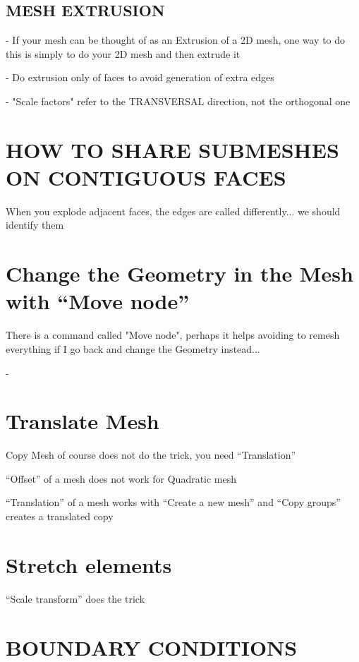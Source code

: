 \documentclass[10pt]{book}
\begin{document}
    
\subsection{MESH EXTRUSION}


- If your mesh can be thought of as an Extrusion of a 2D mesh, one way to do this 
  is simply to do your 2D mesh and then extrude it
  
- Do extrusion only of faces to avoid generation of extra edges    

- "Scale factors" refer to the TRANSVERSAL direction, not the orthogonal one



\section{HOW TO SHARE SUBMESHES ON CONTIGUOUS FACES}


When you explode adjacent faces, the edges are called differently... we should identify them


 \section{Change the Geometry in the Mesh with ``Move node''}


 There is a command called "Move node", perhaps it helps avoiding to remesh everything if I go back and change the Geometry instead...

 - 
 

\section{Translate Mesh}

 
 Copy Mesh of course does not do the trick, you need ``Translation''
 
 ``Offset'' of a mesh does not work for Quadratic mesh
 
 ``Translation'' of a mesh works with ``Create a new mesh'' and ``Copy groups'' creates a translated copy

 
\section{Stretch elements}

  ``Scale transform'' does the trick

  
   
 \section{BOUNDARY CONDITIONS}
\end{document}
